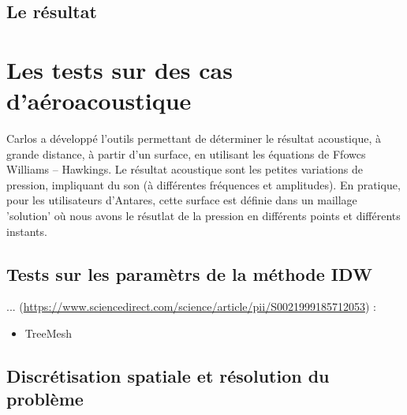 \subsection{Le résultat}



\section{Les tests sur des cas d'aéroacoustique}
Carlos a développé l'outils permettant de déterminer le résultat acoustique, à grande distance, à partir d'un surface, en utilisant les équations de Ffowcs Williams – Hawkings. Le résultat acoustique sont les petites variations de pression, impliquant du son (à différentes fréquences et amplitudes). En pratique, pour les utilisateurs d'Antares, cette surface est définie dans un maillage 'solution' où nous avons le résutlat de la pression en différents points et différents instants.
\subsection{Tests sur les paramètrs de la méthode IDW}




... (\url{https://www.sciencedirect.com/science/article/pii/S0021999185712053}) : 


\begin{itemize}
    \item TreeMesh 
\end{itemize}


\subsection{Discrétisation spatiale et résolution du problème}